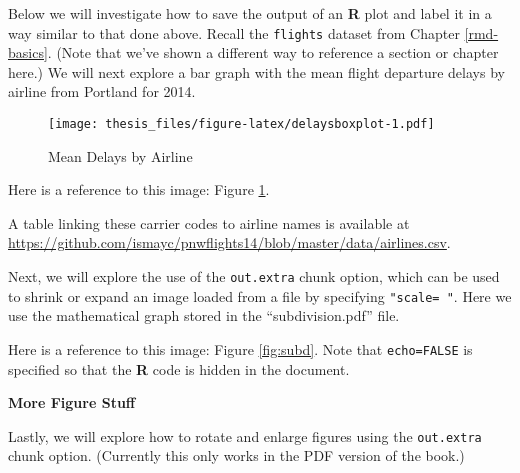 Below we will investigate how to save the output of an \textbf{R} plot and label it in a way similar to that done above. Recall the \texttt{flights} dataset from Chapter \ref{rmd-basics}. (Note that we've shown a different way to reference a section or chapter here.) We will next explore a bar graph with the mean flight departure delays by airline from Portland for 2014.
\begin{Shaded}
\begin{Highlighting}[]
\OtherTok{\textless{}{-}}\SpecialCharTok{\%\textgreater{}\%}
  \SpecialCharTok{\%\textgreater{}\%}
  \NormalTok{(} 
\NormalTok{(}\SpecialCharTok{+}
  \NormalTok{(} \NormalTok{, } \NormalTok{, } \NormalTok{)}
\end{Highlighting}
\end{Shaded}
\begin{figure}
\centering
\texttt{[image: thesis\_files/figure-latex/delaysboxplot-1.pdf]}
\caption{\label{fig:delaysboxplot}Mean Delays by Airline}
\end{figure}
Here is a reference to this image: Figure \ref{fig:delaysboxplot}.

A table linking these carrier codes to airline names is available at \url{https://github.com/ismayc/pnwflights14/blob/master/data/airlines.csv}.

\clearpage

Next, we will explore the use of the \texttt{out.extra} chunk option, which can be used to shrink or expand an image loaded from a file by specifying \texttt{"scale=\ "}. Here we use the mathematical graph stored in the ``subdivision.pdf'' file.

Here is a reference to this image: Figure \ref{fig:subd}. Note that \texttt{echo=FALSE} is specified so that the \textbf{R} code is hidden in the document.

\textbf{More Figure Stuff}

Lastly, we will explore how to rotate and enlarge figures using the \texttt{out.extra} chunk option. (Currently this only works in the PDF version of the book.)


